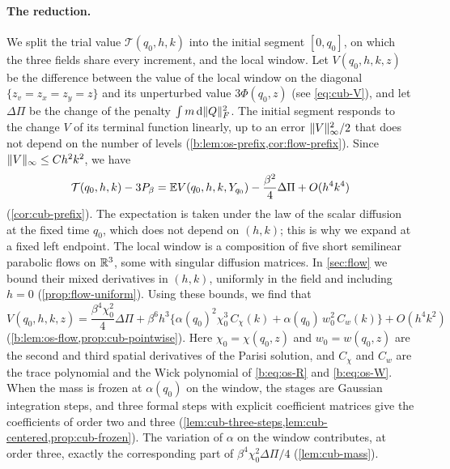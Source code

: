 \paragraph{The reduction.} We split the trial value $\mathcal T(q_0,h,k)$
into the initial segment $[0,q_0]$, on which the three fields share every
increment, and the local window. Let $V(q_0,h,k,z)$ be the difference between
the value of the local window on the diagonal $\{z_v=z_x=z_y=z\}$ and its
unperturbed value $3\Phi(q_0,z)$ (see \eqref{eq:cub-V}), and let $\Delta\Pi$ be
the change of the penalty $\int m\,\mathrm d\lVert Q\rVert_F^2$. The initial segment responds
to the change $V$ of its terminal function linearly, up to an error
$\lVert V\rVert_\infty^2/2$ that does not depend on the number of levels
(\cref{b:lem:os-prefix,cor:flow-prefix}). Since $\lVert V\rVert_\infty\le Ch^2k^2$,
we have
\[
 \mathcal T(q_0,h,k)-3P_\beta=\mathbb E V(q_0,h,k,Y_{q_0})-\frac{\beta^2}4\Delta\Pi
 +O(h^4k^4)
\]
(\cref{cor:cub-prefix}). The expectation is taken under the law of the scalar
diffusion at the fixed time $q_0$, which does not depend on $(h,k)$; this is
why we expand at a fixed left endpoint. The local window is a composition of
five short semilinear parabolic flows on $\mathbb R^3$, some with singular diffusion
matrices. In \cref{sec:flow} we bound their mixed derivatives in $(h,k)$,
uniformly in the field and including $h=0$ (\cref{prop:flow-uniform}). Using
these bounds, we find that
\begin{equation}\label{eq:ov-pointwise}
 V(q_0,h,k,z)=\frac{\beta^4\chi_0^2}4\Delta\Pi
 +\beta^6h^3\bigl\{\alpha(q_0)^2\chi_0^3\,C_\chi(k)
 +\alpha(q_0)\,w_0^2\,C_w(k)\bigr\}+O(h^4k^2)
\end{equation}
(\cref{b:lem:os-flow,prop:cub-pointwise}). Here $\chi_0=\chi(q_0,z)$ and
$w_0=w(q_0,z)$ are the second and third spatial derivatives of the Parisi
solution, and $C_\chi$ and $C_w$ are the trace polynomial and the Wick
polynomial of \eqref{b:eq:os-R} and \eqref{b:eq:os-W}. When the mass is frozen
at $\alpha(q_0)$ on the window, the stages are Gaussian integration steps, and
three formal steps with explicit coefficient matrices give the coefficients of
order two and three (\cref{lem:cub-three-steps,lem:cub-centered,prop:cub-frozen}).
The variation of $\alpha$ on the window contributes, at order three, exactly
the corresponding part of $\beta^4\chi_0^2\Delta\Pi/4$ (\cref{lem:cub-mass}).

